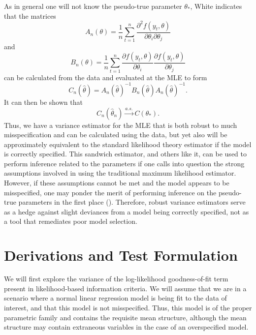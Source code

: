 \documentclass[12pt]{article} %
\theoremstyle{definition}
\begin{document}
		As in general one will not know the pseudo-true parameter $\theta_*$, White indicates that the matrices
		\begin{equation*}
			A_n(\theta) = \frac{1}{n} \sum_{t=1}^{n} \frac{\partial^2 f(y_t,\theta)}{\partial \theta_i \partial \theta_j}
		\end{equation*}
		and
		\begin{equation*}
			B_n(\theta) = \frac{1}{n} \sum_{t=1}^{n} \frac{\partial f(y_t,\theta)}{\partial \theta_i} \frac{\partial f(y_t,\theta)}{\partial \theta_j} 
		\end{equation*}
		can be calculated from the data and evaluated at the MLE to form
		\begin{equation*}
			C_n(\hat{\theta}) = A_n(\hat{\theta})^{-1} B_n(\hat{\theta}) A_n(\hat{\theta})^{-1} .
		\end{equation*}
		It can then be shown that 
		\begin{equation*}
			C_n(\hat{\theta}_n) \xrightarrow[]{a.s.} C(\theta_* ) .
		\end{equation*}
		Thus, we have a variance estimator for the MLE that is both robust to much misspecification and can be calculated using the data, but yet also will be approximately equivalent to the standard
		likelihood theory estimator if the model is correctly specified. This sandwich estimator, and others like it, can be used to perform inference related to the parameters if one calls into question
		the strong assumptions involved in using the traditional maximum likelihood estimator. However, if these assumptions cannot be met and the model appears to be misspecified, one may ponder
		the merit of performing inference on the pseudo-true parameters in the first place (\cite{Huber}). Therefore, robust variance estimators serve as a hedge against slight deviances from a model
		being correctly specified, not as a tool that remediates poor model selection.

\section{Derivations and Test Formulation}

		We will first explore the variance of the log-likelihood goodness-of-fit term present in likelihood-based information criteria. We will assume that we are in a
		scenario where a normal linear regression model is being fit to the data of interest, and that this model is not misspecified. Thus, this model is of the proper
		parametric family and contains the requisite mean structure, although the mean structure may contain extraneous variables in the
		case of an overspecified model.
\end{document}

